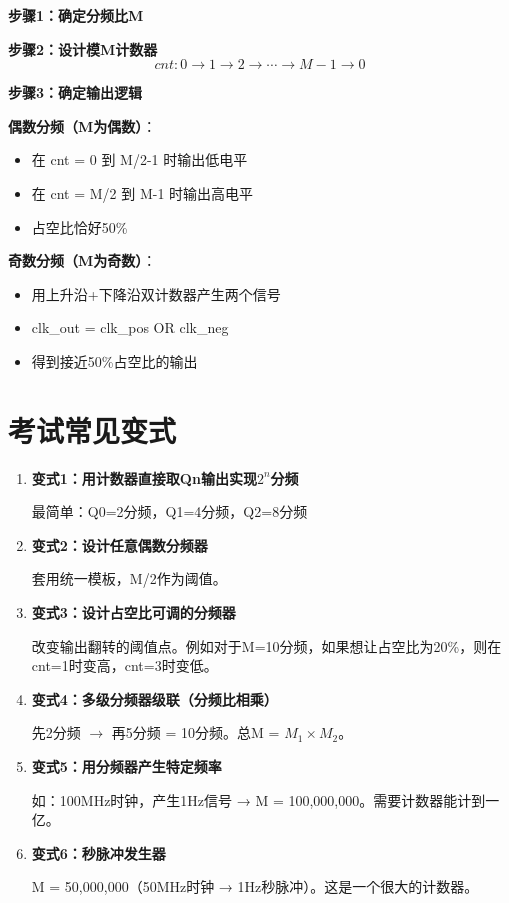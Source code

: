 \begin{designflow}[任意整数分频设计流程]
\textbf{步骤1：确定分频比M}

\textbf{步骤2：设计模M计数器}
$$cnt: 0 \to 1 \to 2 \to \cdots \to M-1 \to 0$$

\textbf{步骤3：确定输出逻辑}

\textbf{偶数分频（M为偶数）}：
\begin{itemize}
  \item 在 cnt = 0 到 M/2-1 时输出低电平
  \item 在 cnt = M/2 到 M-1 时输出高电平
  \item 占空比恰好50\%
\end{itemize}

\textbf{奇数分频（M为奇数）}：
\begin{itemize}
  \item 用上升沿+下降沿双计数器产生两个信号
  \item clk\_out = clk\_pos OR clk\_neg
  \item 得到接近50\%占空比的输出
\end{itemize}
\end{designflow}

\section{考试常见变式}

\begin{enumerate}
  \item \textbf{变式1：用计数器直接取Qn输出实现$2^n$分频}

  最简单：Q0=2分频，Q1=4分频，Q2=8分频

  \item \textbf{变式2：设计任意偶数分频器}

  套用统一模板，M/2作为阈值。

  \item \textbf{变式3：设计占空比可调的分频器}

  改变输出翻转的阈值点。例如对于M=10分频，如果想让占空比为20\%，则在cnt=1时变高，cnt=3时变低。

  \item \textbf{变式4：多级分频器级联（分频比相乘）}

  先2分频 $\to$ 再5分频 = 10分频。总M = $M_1 \times M_2$。

  \item \textbf{变式5：用分频器产生特定频率}

  如：100MHz时钟，产生1Hz信号 → M = 100,000,000。需要计数器能计到一亿。

  \item \textbf{变式6：秒脉冲发生器}

  M = 50,000,000（50MHz时钟 → 1Hz秒脉冲）。这是一个很大的计数器。
\end{enumerate}

